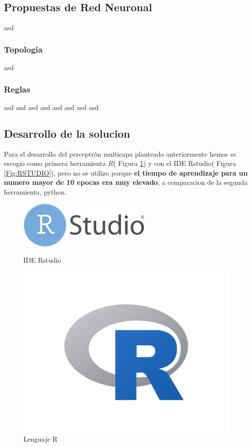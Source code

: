 \documentclass[12pt]{article}
\newcounter{subsubsubsection}[subsubsection]
\newcounter{subsubsubsubsection}[subsubsubsection]
\begin{document}
\subsection{Propuestas de Red Neuronal}
asd
\subsubsection{Topologia}
asd
\subsubsection{Reglas}
asd
asd
asd
asd
asd
asd
asd
asd

\subsection{Desarrollo de la solucion}
Para el desarrollo del perceptrón multicapa planteado anteriormente hemos se escogio como primera herramienta $R$( Figura \ref{Fig:R}) y con el IDE Rstudio( Figura \ref{Fig:RSTUDIO}), pero no se utilizo  porque \textbf{el tiempo de aprendizaje para un numero mayor de 10 epocas era muy elevado}, a comparacion de la segunda herramienta, python.

\clearpage

\begin{figure}[!htb]
   \begin{minipage}{0.48\textwidth}
     \centering
     \includegraphics[width=.7\linewidth]{rstudio}
     \caption{IDE Rstudio}
     \label{Fig:RSTUDIO}
   \end{minipage}\hfill
   \begin {minipage}{0.48\textwidth}
     \centering
     \includegraphics[width=.7\linewidth]{r}
     \caption{Lenguaje R}
     \label{Fig:R}
   \end{minipage}
\end{figure}
\end{document}
